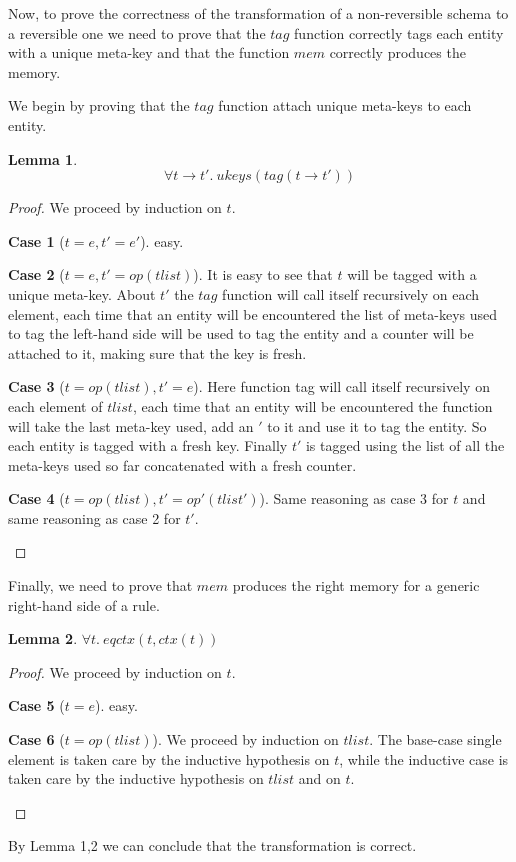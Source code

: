 \documentclass{article}[12pt,a4paper]
\theoremstyle{definition}
\newtheorem{case}{Case}
\newtheorem{lemma}{Lemma}
\begin{document}
Now, to prove the correctness of the transformation of a non-reversible schema
to a reversible one we need to prove that the $tag$ function correctly tags each
entity with a unique meta-key and that the function $mem$ correctly produces the memory.

We begin by proving that the $tag$ function attach unique meta-keys to
each entity.
\begin{lemma}
  \[
    \forall t \rightarrow t'.~ ukeys(tag(t\rightarrow t'))
  \]
\end{lemma}
\begin{proof}
  We proceed by induction on $t$.\\
  \begin{case}[$t=e,t'=e'$]
    easy.
  \end{case}
  \begin{case}[$t=e,t'=op(tlist)$]
    It is easy to see that $t$ will be tagged with a unique meta-key. About $t'$
    the $tag$ function will call itself recursively on each element, each time
    that an entity will be encountered the list of meta-keys used to tag the
    left-hand side will be used to tag the entity and a counter will be attached
    to it, making sure that the key is fresh. 
  \end{case}
  \begin{case}[$t=op(tlist), t'=e$]
    Here function tag will call itself recursively on each element of
    $tlist$, each time that an entity will be encountered the function
    will take the last meta-key used, add an $'$ to it and use it to tag the
    entity. So each entity is tagged with a fresh key. Finally $t'$ is tagged
    using the list of all the meta-keys used so far concatenated with a fresh counter.
  \end{case}
  \begin{case}[$t=op(tlist), t'=op'(tlist')$]
    Same reasoning as case 3 for $t$ and same reasoning as case 2 for $t'$. 
  \end{case}
\end{proof}

Finally, we need to prove that $mem$ produces the right memory for a generic
right-hand side of a rule.

\begin{lemma}
  $
  \forall t.~eqctx(t, ctx(t))
  $
\end{lemma}
\begin{proof}
  We proceed by induction on $t$.
  \begin{case}[$t=e$]
    easy.
  \end{case}
  \begin{case}[$t=op(tlist)$]
    We proceed by induction on $tlist$. The base-case single element is taken
    care by the inductive hypothesis on $t$, while the inductive case is taken
    care by the inductive hypothesis on $tlist$ and on $t$.
  \end{case}
\end{proof}

By Lemma 1,2 we can conclude that the transformation is correct.
\end{document}
